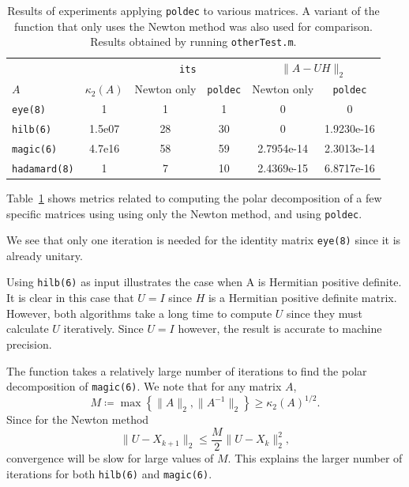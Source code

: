 \documentclass[10pt, A4paper]{article}
\begin{document}
\begin{table}[t]
	\centering
	\begin{tabular}{ l c c c c c }
		\toprule
		& & \multicolumn{2}{c}{\texttt{its}} & 
		\multicolumn{2}{c}{$\|A-UH\|_2$} \\
		\cmidrule(lr){3-4} \cmidrule(lr{12pt}){5-6}
		$A$ & $\kappa_2(A)$ & Newton only & \texttt{poldec} & Newton only 
		& 
		\texttt{poldec} \\
		\midrule
		\texttt{eye(8)}      & 1      & 1  & 1  & 0          
		                                              & 0 \\
		\texttt{hilb(6)}     & 1.5e07 & 28 & 30 & 0          
		                                              & 1.9230e-16 \\
		\texttt{magic(6)}    & 4.7e16 & 58 & 59 & 2.7954e-14 
		                                              &	2.3013e-14 \\
		\texttt{hadamard(8)} & 1      & 7  & 10 & 2.4369e-15 
		                                              & 6.8717e-16 \\
		\bottomrule
	\end{tabular}
	\caption{
	Results of experiments applying \texttt{poldec} 
	to	various matrices. A variant of the function that only uses the 
	Newton method was also used for comparison. Results obtained by 
	running \texttt{otherTest.m}.
	\label{tab:poldecresults}}
\end{table}

Table~\ref{tab:poldecresults} shows metrics related to computing the 
polar decomposition of a few specific matrices using using only the 
Newton method, and using \texttt{poldec}.

We see that only one iteration is needed for the identity matrix 
\texttt{eye(8)} since it is already unitary.

Using \texttt{hilb(6)} as input illustrates the case when A is 
Hermitian 
positive definite.
It is clear in this case that $U = I$ since $H$ is a Hermitian positive 
definite matrix.
However, both algorithms take a long time to compute $U$ since they 
must calculate $U$ iteratively. Since $U = I$ however, the 
result is accurate to machine precision.

The function takes a relatively large number of iterations to find the 
polar decomposition of \texttt{magic(6)}. We note that for any matrix $A$,
$$M \coloneqq \max \left\{\|A\|_2, \|A^{-1}\|_2 \right\} \geq 
\kappa_2(A)^{1/2}.$$
Since for the Newton method
$$\|U - X_{k+1}\|_2 \leq \frac{M}{2} \|U - X_k\|_2^2,$$
convergence will be slow for large values of $M$.
This explains the larger number of iterations for both \texttt{hilb(6)} 
and \texttt{magic(6)}.
\end{document}

